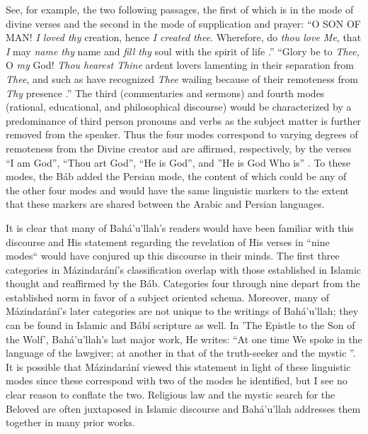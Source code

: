 \documentclass[12pt, oneside]{report}
\begin{document}
See, for example, the two following passages, the first of which is in the mode of divine verses and the second in the mode of supplication and prayer: ``O SON OF MAN! \emph{I loved thy} creation, hence \emph{I created thee}. Wherefore, do \emph{thou love Me}, that \emph{I} may \emph{name thy} name and \emph{fill thy} soul with the spirit of life \cite{bahaullah_hidden_2002}.'' ``Glory be to \emph{Thee}, O \emph{my} God!  \emph{Thou hearest Thine} ardent lovers lamenting in their separation from \emph{Thee}, and such as have recognized \emph{Thee} wailing because of their remoteness from \emph{Thy} presence \cite{bahaullah_prayers_1987}.''
The third (commentaries and sermons) and fourth modes (rational, educational, and philosophical discourse) would be characterized by a predominance of third person pronouns and verbs as the subject matter is further removed from the speaker.
Thus the four modes correspond to varying degrees of remoteness from the Divine creator and are affirmed, respectively, by the verses ``I am God'', ``Thou art God'', ``He is God'', and ''He is God Who is'' \cite{saiedi_gate_2008}.
To these modes, the B\'{a}b added the Persian mode, the content of which could be any of the other four modes \cite{saiedi_gate_2008} and would have the same linguistic markers to the extent that these markers are shared between the Arabic and Persian languages.
\par
It is clear that many of Bah\'{a}'u'llah's readers would have been familiar with this discourse and His statement regarding the revelation of His verses in ``nine modes`` would have conjured up this discourse in their minds.
The first three categories in M\'{a}zindar\'{a}n\'{i}'s classification overlap with those established in Islamic thought and reaffirmed by the B\'{a}b.
Categories four through nine depart from the established norm in favor of a subject oriented schema.
Moreover, many of M\'{a}zindar\'{a}n\'{i}'s later categories are not unique to the writings of Bah\'{a}'u'llah; they can be found in Islamic and B\'{a}b\'{i} scripture as well.
In 'The Epistle to the Son of the Wolf', Bah\'{a}'u'llah's last major work, He writes: “At one time We spoke in the language of the lawgiver; at another in that of the truth-seeker and the mystic \cite{bahaullah_epistle_nodate}”.
It is possible that M\'{a}zindar\'{a}n\'{i} viewed this statement in light of these linguistic modes since these correspond with two of the modes he identified, but I see no clear reason to conflate the two.
Religious law and the mystic search for the Beloved are often juxtaposed in Islamic discourse and Bah\'{a}'u'llah addresses them together in many prior works.
\end{document}
